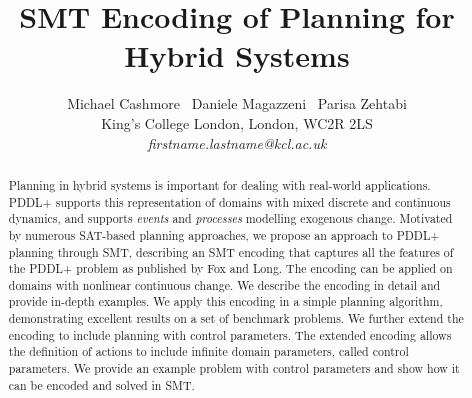 \documentclass[letterpaper]{article}
\begin{document}
\title{SMT Encoding of Planning for Hybrid Systems}
\author{\center
 Michael Cashmore \, Daniele Magazzeni \, Parisa Zehtabi \\
King’s College London, London, WC2R 2LS \\
\textit{firstname.lastname@kcl.ac.uk} \\
}
\maketitle


\begin{abstract}
Planning in hybrid systems is important for dealing with real-world applications. PDDL+ supports this representation of domains with mixed discrete and continuous dynamics, and supports \textit{events} and \textit{processes} modelling exogenous change.
%
Motivated by numerous SAT-based planning approaches, we propose an approach to PDDL+ planning through SMT, describing an SMT encoding that captures all the features of the PDDL+ problem as published by Fox and Long. The encoding can be applied on domains with nonlinear continuous change. We describe the encoding in detail and provide in-depth examples.
%
We apply this encoding in a simple planning algorithm, demonstrating excellent results on a set of benchmark problems. 
%
We further extend the encoding to include planning with control parameters. The extended encoding allows the definition of actions to include infinite domain parameters, called control parameters. We provide an example problem with control parameters and show how it can be encoded and solved in SMT.
\end{abstract}













\end{document}
